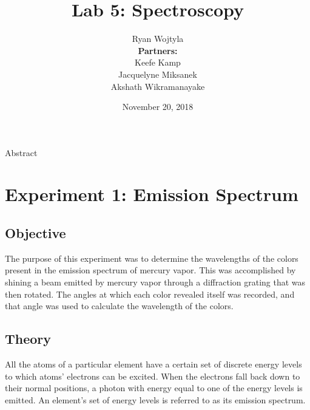 \documentclass{article}
\begin{document}

\begin{titlepage}

  \title{Lab 5: Spectroscopy}
  \author{Ryan Wojtyla \\
    \textbf{Partners:} \\
    Keefe Kamp \\
    Jacquelyne Miksanek \\
    Akshath Wikramanayake \\
    }
  \date{November 20, 2018}

  \maketitle

  \begin{center}
    Abstract
  \end{center}

  \qq

  \thispagestyle{empty}

\end{titlepage}


\section{Experiment 1: Emission Spectrum}


\subsection{Objective}

\qq The purpose of this experiment was to determine the wavelengths of the
colors present in the emission spectrum of mercury vapor. This was accomplished
by shining a beam emitted by mercury vapor through a diffraction grating that
was then rotated. The angles at which each color revealed itself was recorded,
and that angle was used to calculate the wavelength of the colors.

\subsection{Theory}

\qq All the atoms of a particular element have a certain set of discrete
energy levels to which atoms' electrons can be excited. When the electrons fall
back down to their normal positions, a photon with energy equal to one of the
energy levels is emitted. An element's set of energy levels is referred to as
its emission spectrum. 
\end{document}

